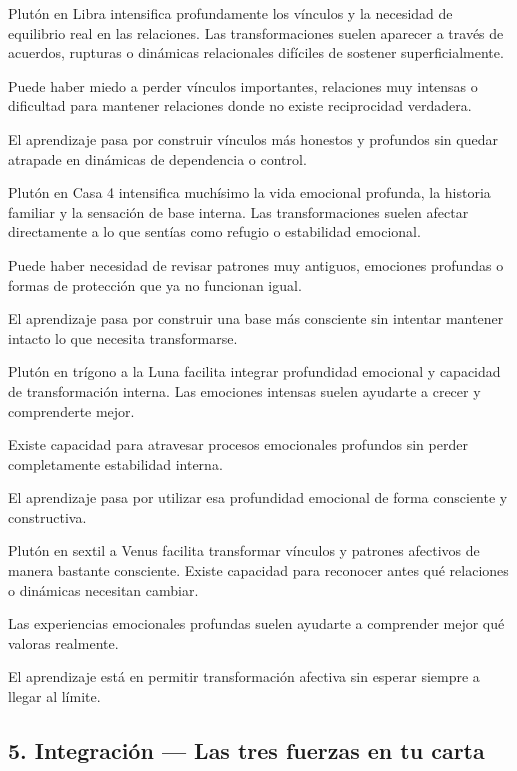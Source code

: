 \documentclass[11pt,a4paper]{article}
\begin{document}
Plutón en Libra intensifica profundamente los vínculos y la necesidad de equilibrio real en las relaciones. Las transformaciones suelen aparecer a través de acuerdos, rupturas o dinámicas relacionales difíciles de sostener superficialmente.

Puede haber miedo a perder vínculos importantes, relaciones muy intensas o dificultad para mantener relaciones donde no existe reciprocidad verdadera.

El aprendizaje pasa por construir vínculos más honestos y profundos sin quedar atrapade en dinámicas de dependencia o control.

Plutón en Casa 4 intensifica muchísimo la vida emocional profunda, la historia familiar y la sensación de base interna. Las transformaciones suelen afectar directamente a lo que sentías como refugio o estabilidad emocional.

Puede haber necesidad de revisar patrones muy antiguos, emociones profundas o formas de protección que ya no funcionan igual.

El aprendizaje pasa por construir una base más consciente sin intentar mantener intacto lo que necesita transformarse.

Plutón en trígono a la Luna facilita integrar profundidad emocional y capacidad de transformación interna. Las emociones intensas suelen ayudarte a crecer y comprenderte mejor.

Existe capacidad para atravesar procesos emocionales profundos sin perder completamente estabilidad interna.

El aprendizaje pasa por utilizar esa profundidad emocional de forma consciente y constructiva.

Plutón en sextil a Venus facilita transformar vínculos y patrones afectivos de manera bastante consciente. Existe capacidad para reconocer antes qué relaciones o dinámicas necesitan cambiar.

Las experiencias emocionales profundas suelen ayudarte a comprender mejor qué valoras realmente.

El aprendizaje está en permitir transformación afectiva sin esperar siempre a llegar al límite.

\vspace{0.8cm}

\subsection{5. Integración — Las tres fuerzas en tu carta}
\end{document}
